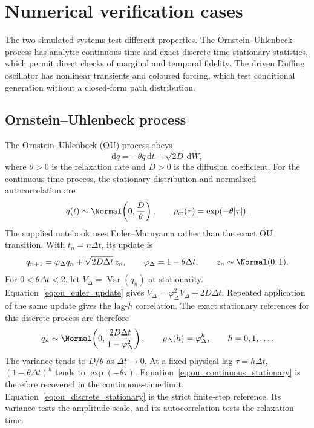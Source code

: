 \section{Numerical verification cases}
\label{sec:examples}

The two simulated systems test different properties. The Ornstein--Uhlenbeck
process has analytic continuous-time and exact discrete-time stationary statistics,
which permit direct checks of marginal and temporal fidelity. The driven Duffing
oscillator has nonlinear transients and coloured forcing, which test conditional
generation without a closed-form path distribution.

\subsection{Ornstein--Uhlenbeck process}
\label{ssec:ou}

The Ornstein--Uhlenbeck (OU) process \cite{uhlenbeck1930} obeys
\begin{equation}
    \mathrm{d}q
    =
    -\theta q\,\mathrm{d}t
    +
    \sqrt{2D}\,\mathrm{d}W,
    \label{eq:ou}
\end{equation}
where $\theta>0$ is the relaxation rate and $D>0$ is the diffusion coefficient.
For the continuous-time process, the stationary distribution and normalised
autocorrelation are
\begin{equation}
    q(t)\sim\Normal\!\left(0,\frac{D}{\theta}\right),
    \qquad
    \rho_{\mathrm{ct}}(\tau)=\exp(-\theta\lvert\tau\rvert).
    \label{eq:ou_continuous_stationary}
\end{equation}
The supplied notebook uses Euler--Maruyama rather than the exact OU transition.
With $t_n=n\Delta t$, its update is
\begin{equation}
    q_{n+1}=\varphi_\Delta q_n+\sqrt{2D\Delta t}\,z_n,
    \qquad
    \varphi_\Delta=1-\theta\Delta t,
    \qquad
    z_n\sim\Normal(0,1).
    \label{eq:ou_euler_update}
\end{equation}
For $0<\theta\Delta t<2$, let $V_\Delta=\operatorname{Var}(q_n)$ at
stationarity. Equation~\eqref{eq:ou_euler_update} gives
$V_\Delta=\varphi_\Delta^2V_\Delta+2D\Delta t$. Repeated application of the
same update gives the lag-$h$ correlation. The exact stationary references for
this discrete process are therefore
\begin{equation}
    q_n\sim\Normal\!\left(0,\frac{2D\Delta t}{1-\varphi_\Delta^2}\right),
    \qquad
    \rho_{\Delta}(h)=\varphi_\Delta^h,
    \qquad h=0,1,\ldots .
    \label{eq:ou_discrete_stationary}
\end{equation}
The variance tends to $D/\theta$ as $\Delta t\to0$. At a fixed physical lag
$\tau=h\Delta t$, $(1-\theta\Delta t)^h$ tends to $\exp(-\theta\tau)$.
Equation~\eqref{eq:ou_continuous_stationary} is therefore recovered in the
continuous-time limit. Equation~\eqref{eq:ou_discrete_stationary} is the strict
finite-step reference. Its variance tests the amplitude scale, and its
autocorrelation tests the relaxation time.

